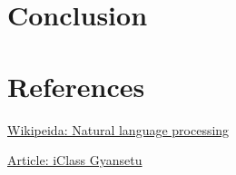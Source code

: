\documentclass[a4paper,12pt]{report}
\begin{document}
    
    \chapter{Conclusion}

    
    \chapter{References}


    \begin{thebibliography}{9}
        \href{https://en.wikipedia.org/wiki/Natural_language_processing}{Wikipeida: Natural language processing}

        
        \href{https://www.gyansetu.in/what-is-natural-language-processing/}{Article: iClass Gyansetu}
    \end{thebibliography}
\end{document}
